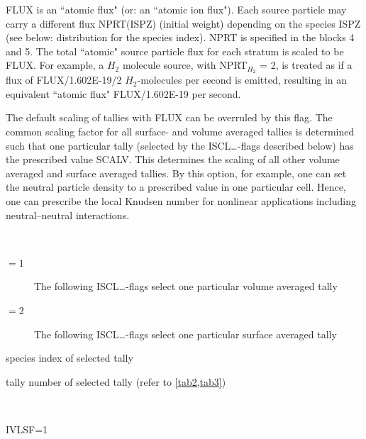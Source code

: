 \begin{description}
\begin{description}
                FLUX is an ``atomic flux" (or: an ``atomic ion flux").
                Each source particle may carry a different flux NPRT(ISPZ) (initial weight)
                depending on the species ISPZ (see below: distribution for the species index).
                NPRT is specified in the blocks 4 and 5.
                The total ``atomic" source particle flux for each stratum is scaled to be FLUX.
                For example, a $H_2$ molecule source, with NPRT$_{H_2}$ = 2, is treated as if a
                flux of FLUX/1.602E-19/2 $H_2$-molecules per second is emitted, resulting in an
                equivalent ``atomic flux" FLUX/1.602E-19 per second.
          \item[SCALV$\ne$0] The default scaling of tallies with FLUX can be overruled by
                this flag.
                The common scaling factor for all surface- and volume averaged tallies is
                determined such that one particular tally (selected by the ISCL\dots-flags
                described below) has the prescribed value SCALV.
                This determines the scaling of all other volume averaged and surface averaged
                tallies.
                By this option, for example, one can set the neutral particle density to a
                prescribed value in one particular cell.
                Hence, one can prescribe the local Knudsen number for nonlinear applications
                including neutral--neutral interactions.
        \end{description}
  \item[IVLSF] ~ 

        \begin{description}
          \item[$= 1$] The following ISCL\dots-flags select one
                particular volume averaged tally
          \item[$= 2$] The following ISCL\dots-flags
                select one particular surface averaged tally
        \end{description}
  \item[ISCLS]
        species index of selected tally
  \item[ISCLT] tally number of selected tally
        (refer to \cref{tab2,tab3})
  \item[ISCL1, ISCL2, ISCL3, ISCLB, ISCLA]~

        \begin{description}
          \item[IVLSF=1]~ 


\end{description}
\end{description}
